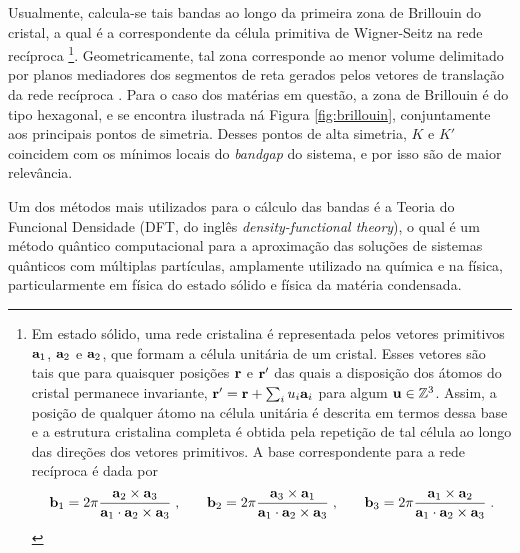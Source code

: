 Usualmente, calcula-se tais bandas ao longo da primeira zona de Brillouin do
cristal, a qual é a correspondente da célula primitiva de Wigner-Seitz na rede recíproca
\footnote{
  Em estado sólido, uma rede cristalina é representada pelos vetores primitivos
  $\mathbf{a}_1$, $\mathbf{a}_2$ e $\mathbf{a}_2$, que formam a célula unitária de um
  cristal. Esses vetores são tais que para quaisquer posições $\mathbf{r}$ e
  $\mathbf{r}'$ das quais a disposição dos átomos do cristal permanece invariante,
  $\mathbf{r}' = \mathbf{r} + \sum_i u_i \mathbf{a}_i $ para algum $ \mathbf{u} \in \mathbb{Z}^3$.
  Assim, a posição de qualquer átomo na célula unitária é descrita em termos dessa base e a
  estrutura cristalina completa é obtida pela repetição de tal célula ao longo das
  direções dos vetores primitivos. A base correspondente para a rede recíproca é
  dada por
  $$ 
    \mathbf{b}_1 = 2\pi\frac{\mathbf{a}_2 \times \mathbf{a}_3}{\mathbf{a}_1 \cdot \mathbf{a}_2 \times \mathbf{a}_3} \;\mathrm{,} \qquad 
    \mathbf{b}_2 = 2\pi\frac{\mathbf{a}_3 \times \mathbf{a}_1}{\mathbf{a}_1 \cdot \mathbf{a}_2 \times \mathbf{a}_3} \;\mathrm{,} \qquad
    \mathbf{b}_3 = 2\pi\frac{\mathbf{a}_1 \times \mathbf{a}_2}{\mathbf{a}_1 \cdot \mathbf{a}_2 \times \mathbf{a}_3} \;\mathrm{.} 
  $$
}. Geometricamente, tal zona corresponde ao menor volume delimitado por planos
mediadores dos segmentos de reta gerados pelos vetores de translação da rede recíproca
\cite{kittel2018introduction}. Para o caso dos matérias em questão, a zona de
Brillouin é do tipo hexagonal, e se encontra ilustrada ná Figura
\ref{fig:brillouin}, conjuntamente aos principais pontos de simetria. Desses
pontos de alta simetria, $K$ e $K'$ coincidem com os mínimos locais do
\textit{bandgap} do sistema, e por isso são de maior relevância.

Um dos métodos mais utilizados para o cálculo das bandas é a Teoria do Funcional
Densidade (DFT, do inglês \textit{density-functional theory}), o qual é um
método quântico computacional para a aproximação das soluções de sistemas
quânticos com múltiplas partículas, amplamente utilizado na química e na física,
particularmente em física do estado sólido e física da matéria condensada.


